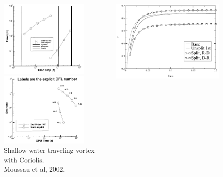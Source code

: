 \begin{frame}[shrink=10]
  \begin{columns}
    \begin{column}{0.5\textwidth}
      \centering
      \includegraphics[width=0.78\textwidth]{figures/MousseauOceanError} \\
      \includegraphics[width=0.78\textwidth]{figures/MousseauOceanTime} \\
      \scriptsize{Shallow water traveling vortex with Coriolis. \\ Moussau et al, 2002.}
    \end{column}
    \begin{column}{0.5\textwidth}
      \includegraphics[width=0.78\textwidth]{figures/KnollSplittingRD} \\

\end{column}
\end{columns}
\end{frame}
